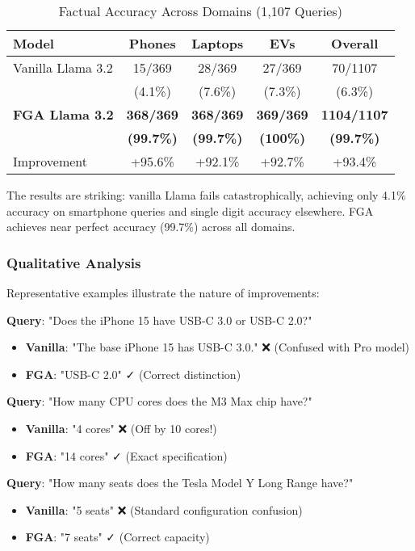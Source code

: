 \documentclass[11pt, a4paper]{article}
\theoremstyle{definition}
\begin{document}
\begin{table}[h]
\centering
\caption{Factual Accuracy Across Domains (1,107 Queries)}
\small %
\begin{tabular}{@{}lcccc@{}} %
\toprule
\textbf{Model} & \textbf{Phones} & \textbf{Laptops} & \textbf{EVs} & \textbf{Overall} \\
\midrule
Vanilla Llama 3.2 & 15/369 & 28/369 & 27/369 & 70/1107 \\
 & (4.1\%) & (7.6\%) & (7.3\%) & (6.3\%) \\
\textbf{FGA Llama 3.2} & \textbf{368/369} & \textbf{368/369} & \textbf{369/369} & \textbf{1104/1107} \\
 & \textbf{(99.7\%)} & \textbf{(99.7\%)} & \textbf{(100\%)} & \textbf{(99.7\%)} \\
\midrule
Improvement & +95.6\% & +92.1\% & +92.7\% & +93.4\% \\
\bottomrule
\end{tabular}
\end{table}

The results are striking: vanilla Llama fails catastrophically, achieving only 4.1\% accuracy on smartphone queries and single digit accuracy elsewhere. FGA achieves near perfect accuracy (99.7\%) across all domains.

\subsubsection{Qualitative Analysis}

Representative examples illustrate the nature of improvements:

\textbf{Query}: "Does the iPhone 15 have USB-C 3.0 or USB-C 2.0?"
\begin{itemize}
    \item \textbf{Vanilla}: "The base iPhone 15 has USB-C 3.0." ❌ (Confused with Pro model)
    \item \textbf{FGA}: "USB-C 2.0" ✓ (Correct distinction)
\end{itemize}

\textbf{Query}: "How many CPU cores does the M3 Max chip have?"
\begin{itemize}
    \item \textbf{Vanilla}: "4 cores" ❌ (Off by 10 cores!)
    \item \textbf{FGA}: "14 cores" ✓ (Exact specification)
\end{itemize}

\textbf{Query}: "How many seats does the Tesla Model Y Long Range have?"
\begin{itemize}
    \item \textbf{Vanilla}: "5 seats" ❌ (Standard configuration confusion)
    \item \textbf{FGA}: "7 seats" ✓ (Correct capacity)
\end{itemize}
\end{document}
